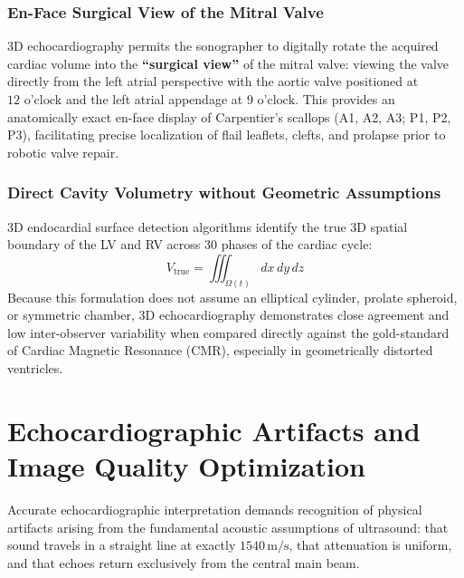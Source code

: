\documentclass[11pt,a4paper]{article}
\begin{document}
\subsubsection{En-Face Surgical View of the Mitral Valve}
3D echocardiography permits the sonographer to digitally rotate the acquired cardiac volume into the \textbf{``surgical view''} of the mitral valve: viewing the valve directly from the left atrial perspective with the aortic valve positioned at $12\text{ o'clock}$ and the left atrial appendage at $9\text{ o'clock}$. This provides an anatomically exact en-face display of Carpentier's scallops (A1, A2, A3; P1, P2, P3), facilitating precise localization of flail leaflets, clefts, and prolapse prior to robotic valve repair.

\subsubsection{Direct Cavity Volumetry without Geometric Assumptions}
3D endocardial surface detection algorithms identify the true 3D spatial boundary of the LV and RV across 30 phases of the cardiac cycle:
\begin{equation}
    V_{\text{true}} = \iiint_{\Omega(t)} dx \, dy \, dz
\end{equation}
Because this formulation does not assume an elliptical cylinder, prolate spheroid, or symmetric chamber, 3D echocardiography demonstrates close agreement and low inter-observer variability when compared directly against the gold-standard of Cardiac Magnetic Resonance (CMR), especially in geometrically distorted ventricles.

\newpage
\section{Echocardiographic Artifacts and Image Quality Optimization}

Accurate echocardiographic interpretation demands recognition of physical artifacts arising from the fundamental acoustic assumptions of ultrasound: that sound travels in a straight line at exactly $1540\,\text{m/s}$, that attenuation is uniform, and that echoes return exclusively from the central main beam.
\end{document}

